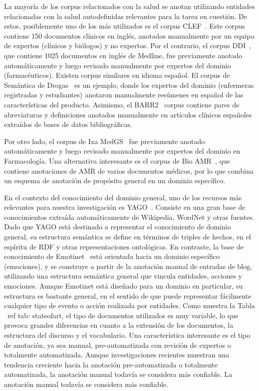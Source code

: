 La mayoría de los corpus relacionados con la salud se anotan utilizando entidades relacionadas con la salud autodefinidas relevantes para la tarea en cuestión. De estos, posiblemente uno de los más utilizados es el corpus CLEF~\cite{kelly2016overview}. Este corpus contiene 150 documentos clínicos en inglés, anotados manualmente por un equipo de expertos (clínicos y biólogos) y no expertos. Por el contrario, el corpus DDI~\cite{herrero2013ddi}, que contiene 1025 documentos en inglés de Medline, fue previamente anotado automáticamente y luego revisado manualmente por expertos del dominio (farmacéuticos). Existen corpus similares en idioma español. El corpus de Semántica de Drogas~\cite{moreno2017drugsemantics} es un ejemplo, donde los expertos del dominio (enfermeras registradas y estudiantes) anotaron manualmente resúmenes en español de las características del producto. {Asimismo, el BARR2}~\cite{barr2} {corpus contiene pares de abreviaturas y definiciones anotados manualmente en artículos clínicos españoles extraídos de bases de datos bibliográficas.}

Por otro lado, el corpus de Ixa MedGS~\cite{oronoz2015creation} fue previamente anotado automáticamente y luego revisado manualmente por expertos del dominio en Farmacología. Una alternativa interesante es el corpus de Bio AMR~\cite{bioamr}, que contiene anotaciones de AMR de varios documentos médicos, por lo que combina un esquema de anotación de propósito general en un dominio específico.

En el contexto del conocimiento del dominio general, uno de los recursos más relevantes para nuestra investigación es YAGO~\cite{fabian2007yago}.
Consiste en una gran base de conocimientos extraída automáticamente de Wikipedia, WordNet y otras fuentes. Dado que YAGO está destinado a representar el conocimiento de dominio general, su estructura semántica se define en términos de triples de hechos, en el espíritu de RDF y otras representaciones ontológicas.
En contraste, la base de conocimiento de Emotinet~\cite{emotinet} está orientada hacia un dominio específico (emociones), y se construye a partir de la anotación manual de entradas de blog, utilizando una estructura semántica general que vincula entidades, acciones y emociones.
Aunque Emotinet está diseñado para un dominio en particular, su estructura es bastante general, en el sentido de que puede representar fácilmente cualquier tipo de evento o acción realizada por entidades. Como muestra la Tabla \ ref {tab: stateofart}, el tipo de documentos utilizados es muy variable, lo que provoca grandes diferencias en cuanto a la extensión de los documentos, la estructura del discurso y el vocabulario. Una característica interesante es el tipo de anotación, ya sea manual, pre-automatizada con revisión de expertos o totalmente automatizada. Aunque investigaciones recientes muestran una tendencia creciente hacia la anotación pre-automatizada o totalmente automatizada, la anotación manual todavía se considera más confiable. La anotación manual todavía se considera más confiable.


